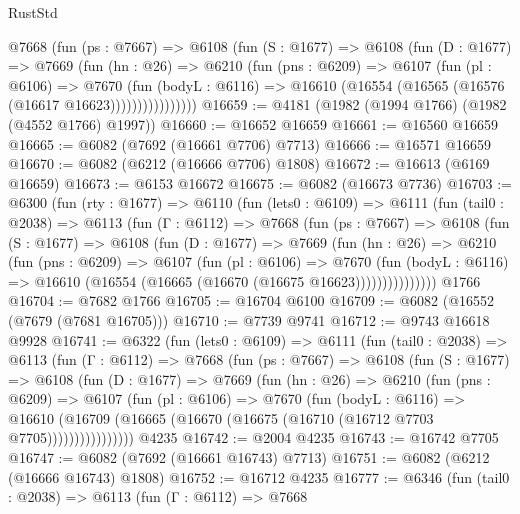 \begin{lexlean}{RustStd}
\begin{coremodule}
            @7668
              (fun (ps : @7667) =>
              @6108
                (fun (S : @1677) =>
                @6108
                  (fun (D : @1677) =>
                  @7669
                    (fun (hn : @26) =>
                    @6210
                      (fun (pns : @6209) =>
                      @6107
                        (fun (pl : @6106) =>
                        @7670
                          (fun (bodyL : @6116) =>
                          @16610 (@16554 (@16565 (@16576 (@16617 @16623))))))))))))))))
@16659 := @4181 (@1982 (@1994 @1766) (@1982 (@4552 @1766) @1997))
@16660 := @16652 @16659
@16661 := @16560 @16659
@16665 := @6082 (@7692 (@16661 @7706) @7713)
@16666 := @16571 @16659
@16670 := @6082 (@6212 (@16666 @7706) @1808)
@16672 := @16613 (@6169 @16659)
@16673 := @6153 @16672
@16675 := @6082 (@16673 @7736)
@16703 := @6300
    (fun (rty : @1677) =>
    @6110
      (fun (lets0 : @6109) =>
      @6111
        (fun (tail0 : @2038) =>
        @6113
          (fun (Γ : @6112) =>
          @7668
            (fun (ps : @7667) =>
            @6108
              (fun (S : @1677) =>
              @6108
                (fun (D : @1677) =>
                @7669
                  (fun (hn : @26) =>
                  @6210
                    (fun (pns : @6209) =>
                    @6107
                      (fun (pl : @6106) =>
                      @7670
                        (fun (bodyL : @6116) =>
                        @16610 (@16554 (@16665 (@16670 (@16675 @16623)))))))))))))))
    @1766
@16704 := @7682 @1766
@16705 := @16704 @6100
@16709 := @6082 (@16552 (@7679 (@7681 @16705)))
@16710 := @7739 @9741
@16712 := @9743 @16618 @9928
@16741 := @6322
    (fun (lets0 : @6109) =>
    @6111
      (fun (tail0 : @2038) =>
      @6113
        (fun (Γ : @6112) =>
        @7668
          (fun (ps : @7667) =>
          @6108
            (fun (S : @1677) =>
            @6108
              (fun (D : @1677) =>
              @7669
                (fun (hn : @26) =>
                @6210
                  (fun (pns : @6209) =>
                  @6107
                    (fun (pl : @6106) =>
                    @7670
                      (fun (bodyL : @6116) =>
                      @16610
                        (@16709 (@16665 (@16670 (@16675 (@16710 (@16712 @7703 @7705))))))))))))))))
    @4235
@16742 := @2004 @4235
@16743 := @16742 @7705
@16747 := @6082 (@7692 (@16661 @16743) @7713)
@16751 := @6082 (@6212 (@16666 @16743) @1808)
@16752 := @16712 @4235
@16777 := @6346
    (fun (tail0 : @2038) =>
    @6113
      (fun (Γ : @6112) =>
      @7668

\end{coremodule}
\end{lexlean}
